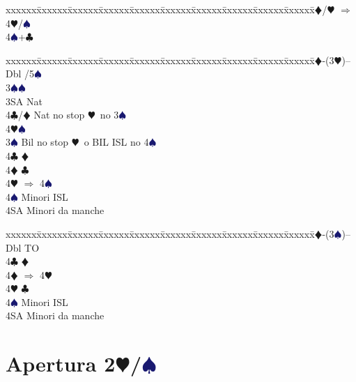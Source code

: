\documentclass[a4paper,italian]{article}
\newcommand{\BC}{\textcolor{OliveGreen}{$\clubsuit$}}
\newcommand{\BD}{\textcolor{RedOrange}{$\vardiamondsuit$}}
\newcommand{\BH}{\textcolor{Red2}{$\varheartsuit${}}}
\newcommand{\BS}{\textcolor{MidnightBlue}{$\spadesuit${}}}
\newcommand{\pdfh}{\texorpdfstring{\BH{}}{H}}
\newcommand{\pdfs}{\texorpdfstring{\BS{}}{S}}
\newenvironment{bidtable}
{\begin{tabbing}

    xxxxxx\=xxxxxx\=xxxxxx\=xxxxxx\=xxxxxx\=xxxxxx\=xxxxxx\=xxxxxx\=xxxxxx\=xxxxxx\=\kill}
{\end{tabbing} }%
\begin{document}
\begin{multicols}{2}
\begin{bidtable}
        4\BD/\BH \> $\Rightarrow$ 4\BH /\BS \\
        4\BS {}+\BC \-
    \end{bidtable}
    \begin{bidtable}
        2\BD-(3\BH)--\+\\
        Dbl /5\BS\ \+\\
        3\BS{}\BS\ \\
        3SA\> Nat\\
        4\BC/\BD\> Nat no stop \BH\ no 3\BS\ \\
        4\BH{}\BS \-\\
        3\BS \> Bil no stop \BH\ o BIL ISL no 4\BS \\
        4\BC \> \BD \\
        4\BD \> \BC \\
        4\BH \> $\Rightarrow$ 4\BS \\
        4\BS \> Minori ISL\\
        4SA \> Minori da manche\-
    \end{bidtable}
    \begin{bidtable}
        2\BD-(3\BS)--\+\\
        Dbl \> TO\\
        4\BC \> \BD \\
        4\BD \> $\Rightarrow$ 4\BH \\
        4\BH \> \BC \\
        4\BS \> Minori ISL\\
        4SA \> Minori da manche\-
    \end{bidtable}
\end{multicols}

\newpage

\section{Apertura 2\pdfh/\pdfs}
\end{document}
